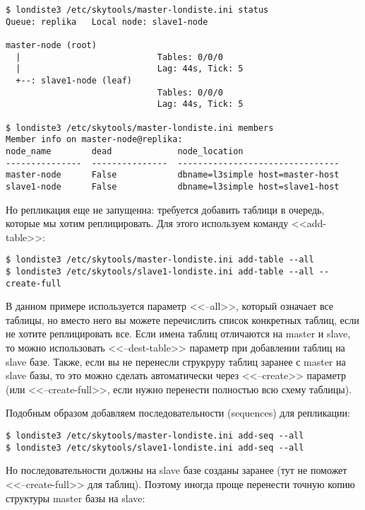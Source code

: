 \begin{lstlisting}[label=lst:londiste-replica13,caption=Статус кластера]
$ londiste3 /etc/skytools/master-londiste.ini status
Queue: replika   Local node: slave1-node

master-node (root)
  |                           Tables: 0/0/0
  |                           Lag: 44s, Tick: 5
  +--: slave1-node (leaf)
                              Tables: 0/0/0
                              Lag: 44s, Tick: 5

$ londiste3 /etc/skytools/master-londiste.ini members
Member info on master-node@replika:
node_name        dead             node_location
---------------  ---------------  --------------------------------
master-node      False            dbname=l3simple host=master-host
slave1-node      False            dbname=l3simple host=slave1-host
\end{lstlisting}

Но репликация еще не запущенна: требуется добавить таблици в очередь, которые мы хотим реплицировать. Для этого используем команду <<add-table>>:

\begin{lstlisting}[label=lst:londiste-replica13,caption=Добавляем таблицы]
$ londiste3 /etc/skytools/master-londiste.ini add-table --all
$ londiste3 /etc/skytools/slave1-londiste.ini add-table --all --create-full
\end{lstlisting}

В данном примере используется параметр <<--all>>, который означает все таблицы,
но вместо него вы можете перечислить список конкретных таблиц, если не хотите
реплицировать все. Если имена таблиц отличаются на master и slave, то можно использовать <<--dest-table>> параметр при добавлении таблиц на slave базе.
Также, если вы не перенесли струкруру таблиц заранее с master на slave базы, то это можно сделать автоматически через <<--create>> параметр (или <<--create-full>>, если нужно перенести полностью всю схему таблицы).

Подобным образом добавляем последовательности (sequences) для репликации:

\begin{lstlisting}[label=lst:londiste-replica14,caption=Добавляем последовательности]
$ londiste3 /etc/skytools/master-londiste.ini add-seq --all
$ londiste3 /etc/skytools/slave1-londiste.ini add-seq --all
\end{lstlisting}

Но последовательности должны на slave базе созданы заранее (тут не поможет <<--create-full>> для таблиц). Поэтому иногда проще перенести точную копию структуры master базы на slave:

